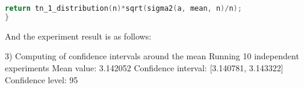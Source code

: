\documentclass{article}
\begin{document}
\begin{enumerate}
\begin{lstlisting}[language=C]
    return tn_1_distribution(n)*sqrt(sigma2(a, mean, n)/n);
}
\end{lstlisting}
And the experiment result is as follows:
\begin{messageshell}
3) Computing of confidence intervals around the mean
Running 10 independent experiments
Mean value: 3.142052
Confidence interval: [3.140781, 3.143322]
Confidence level: 95%
\end{messageshell}
\end{enumerate}
\end{document}

